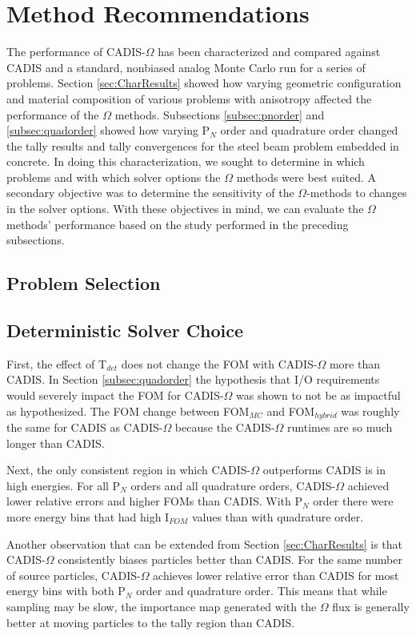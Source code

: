 \section{Method Recommendations}
\label{sec:method_recs}

The performance of CADIS-$\Omega$ has been characterized and compared against
CADIS and a standard, nonbiased analog Monte Carlo run for a series of problems.
Section \ref{sec:CharResults} showed how varying geometric configuration and
material composition of various problems with anisotropy affected the
performance of the $\Omega$ methods.
Subsections \ref{subsec:pnorder} and \ref{subsec:quadorder} showed how varying
P$_N$ order and quadrature order changed the tally results and tally
convergences for the steel beam problem embedded in concrete. In doing this
characterization, we sought to determine in which problems and with which solver
options the $\Omega$ methods were best suited. A secondary objective was to
determine the sensitivity of the $\Omega$-methods to changes in the solver
options. With these objectives in mind, we can evaluate the $\Omega$ methods'
performance based on the study performed in the preceding subsections.

\subsection{Problem Selection}
\label{sec:materials_recs}

\subsection{Deterministic Solver Choice}
\label{sec:deterministic_recs}
First, the effect of T$_{det}$ does not change the FOM with CADIS-$\Omega$ more
than CADIS. In
Section \ref{subsec:quadorder} the hypothesis that I/O requirements would severely
impact the FOM for CADIS-$\Omega$ was shown to not be as impactful as
hypothesized. The FOM change between
FOM$_{MC}$ and FOM$_{hybrid}$ was roughly the same for CADIS as CADIS-$\Omega$
because the CADIS-$\Omega$ runtimes are so much longer than CADIS.

Next, the only consistent region in which CADIS-$\Omega$ outperforms CADIS is in
high energies. For all P$_N$ orders and all quadrature orders, CADIS-$\Omega$
achieved lower relative errors and higher FOMs than CADIS. With P$_N$ order
there were more energy bins that had high I$_{FOM}$ values than with quadrature
order.

Another observation that can be extended from Section \ref{sec:CharResults} is
that CADIS-$\Omega$ consistently biases
particles better than CADIS. For the same number of source particles,
CADIS-$\Omega$
achieves lower relative error than CADIS for most energy bins with both P$_N$
order and quadrature order. This means that while sampling may be slow, the
importance map generated with the $\Omega$ flux is generally
better at moving particles to the tally region than
CADIS.

